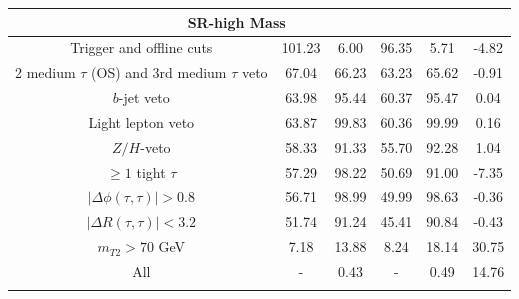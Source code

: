 \documentclass{ws-mpla}
\begin{document}
\begin{table}[t]
{\begin{tabular}{@{}c c c c c c@{}}
%
\multicolumn{5}{c}{ \textbf{SR-high Mass} }\\\hline
Trigger and offline cuts                        &   101.23 &  6.00 &    96.35 &  5.71 &  -4.82 \\
2 medium $\tau$ (OS) and 3rd medium $\tau$ veto &    67.04 & 66.23 &    63.23 & 65.62 &  -0.91 \\
$b$-jet veto                                    &    63.98 & 95.44 &    60.37 & 95.47 &   0.04 \\
Light lepton veto                               &    63.87 & 99.83 &    60.36 & 99.99 &   0.16 \\
$Z/H$-veto                                      &    58.33 & 91.33 &    55.70 & 92.28 &   1.04 \\
$ \geq 1 $ tight $\tau$                         &    57.29 & 98.22 &    50.69 & 91.00 &  -7.35 \\
$ |\Delta\phi(\tau,\tau)| > 0.8 $               &    56.71 & 98.99 &    49.99 & 98.63 &  -0.36 \\
$ |\Delta R(\tau,\tau)| < 3.2 $                 &    51.74 & 91.24 &    45.41 & 90.84 &  -0.43 \\
$ m_{T2} > 70 $ GeV                             &     7.18 & 13.88 &     8.24 & 18.14 &  30.75 \\ \hline
All                                             &        - &  0.43 &        - &  0.49 &  14.76 \\[.2cm] \botrule
\end{tabular}
\label{tab:120GeV} }
\end{table}
\end{document}
